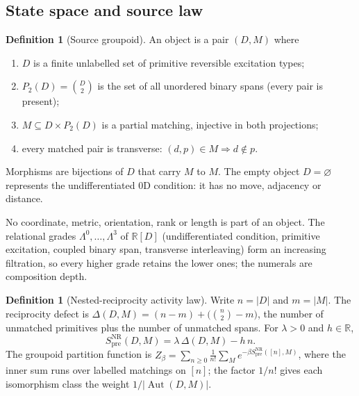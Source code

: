 \documentclass[11pt]{article}
\theoremstyle{definition}
\newtheorem{definition}[theorem]{Definition}
\theoremstyle{remark}
\newcommand{\Spre}{S^{\mathrm{NR}}_{\mathrm{pre}}}
\newcommand{\R}{\mathbb{R}}
\newcommand{\Aut}{\operatorname{Aut}}
\begin{document}
\subsection{State space and source law}
\label{sec:state}

\begin{definition}[Source groupoid]
\label{def:groupoid}
An object is a pair $(D,M)$ where
\begin{enumerate}
\item $D$ is a finite unlabelled set of primitive reversible excitation types;
\item $P_2(D)=\binom{D}{2}$ is the set of all unordered binary spans (every pair is present);
\item $M\subseteq D\times P_2(D)$ is a partial matching, injective in both projections;
\item every matched pair is transverse: $(d,p)\in M \Rightarrow d\notin p$.
\end{enumerate}
Morphisms are bijections of $D$ that carry $M$ to $M$. The empty object $D=\varnothing$
represents the undifferentiated 0D condition: it has no move, adjacency or distance.
\end{definition}

No coordinate, metric, orientation, rank or length is part of an object. The relational
grades $\Lambda^0,\dots,\Lambda^3$ of $\R[D]$ (undifferentiated condition, primitive
excitation, coupled binary span, transverse interleaving) form an increasing filtration,
so every higher grade retains the lower ones; the numerals are composition depth.

\begin{definition}[Nested-reciprocity activity law]
\label{def:action}
Write $n=|D|$ and $m=|M|$. The reciprocity defect is
$\Delta(D,M)=(n-m)+\bigl(\binom n2-m\bigr)$, the number of unmatched primitives plus the
number of unmatched spans. For $\lambda>0$ and $h\in\R$,
\begin{equation}
\Spre(D,M)=\lambda\,\Delta(D,M)-h\,n .
\label{eq:action}
\end{equation}
The groupoid partition function is
$Z_\beta=\sum_{n\ge0}\frac{1}{n!}\sum_{M}e^{-\beta \Spre([n],M)}$, where the inner sum runs
over labelled matchings on $[n]$; the factor $1/n!$ gives each isomorphism class the
weight $1/|\Aut(D,M)|$.
\end{definition}
\end{document}
